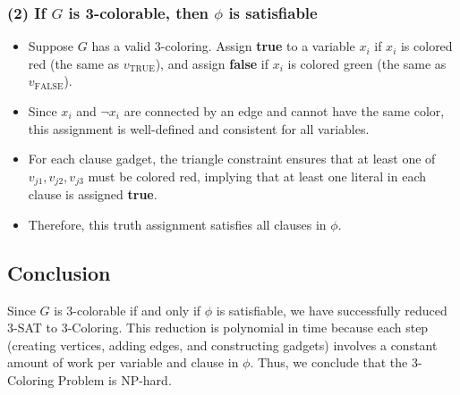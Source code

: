 \documentclass[11pt]{article}
\begin{document}
\subsubsection*{(2) If \( G \) is 3-colorable, then \( \phi \) is satisfiable}

\begin{itemize}
    \item Suppose \( G \) has a valid 3-coloring. Assign \textbf{true} to a variable \( x_i \) if \( x_i \) is colored red (the same as \( v_{\text{TRUE}} \)), and assign \textbf{false} if \( x_i \) is colored green (the same as \( v_{\text{FALSE}} \)).
    \item Since \( x_i \) and \( \neg x_i \) are connected by an edge and cannot have the same color, this assignment is well-defined and consistent for all variables.
    \item For each clause gadget, the triangle constraint ensures that at least one of \( v_{j1}, v_{j2}, v_{j3} \) must be colored red, implying that at least one literal in each clause is assigned \textbf{true}.
    \item Therefore, this truth assignment satisfies all clauses in \( \phi \).
\end{itemize}

\subsection*{Conclusion}

Since \( G \) is 3-colorable if and only if \( \phi \) is satisfiable, we have successfully reduced 3-SAT to 3-Coloring. This reduction is polynomial in time because each step (creating vertices, adding edges, and constructing gadgets) involves a constant amount of work per variable and clause in \( \phi \). Thus, we conclude that the 3-Coloring Problem is NP-hard.
\end{document}
